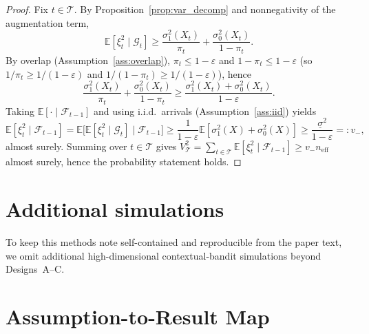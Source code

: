 \documentclass[11pt]{article}
\numberwithin{equation}{section}
\theoremstyle{plain}
\theoremstyle{definition}
\theoremstyle{remark}
\newcommand{\E}{\mathbb{E}}
\newcommand{\cF}{\mathcal{F}}
\newcommand{\cG}{\mathcal{G}}
\newcommand{\pit}{\pi_t}
\begin{document}
\begin{proof}
Fix $t\in\mathcal{T}$. By Proposition~\ref{prop:var_decomp} and nonnegativity of
the augmentation term,
\[
\E[\xi_t^2\mid \cG_t]
\ge
\frac{\sigma_1^2(X_t)}{\pit}+\frac{\sigma_0^2(X_t)}{1-\pit}.
\]
By overlap (Assumption~\ref{ass:overlap}), $\pi_t\le 1-\varepsilon$ and $1-\pi_t\le 1-\varepsilon$ (so $1/\pi_t\ge 1/(1-\varepsilon)$ and $1/(1-\pi_t)\ge 1/(1-\varepsilon)$), hence
\[
\frac{\sigma_1^2(X_t)}{\pi_t}+\frac{\sigma_0^2(X_t)}{1-\pi_t}
\ge
\frac{\sigma_1^2(X_t)+\sigma_0^2(X_t)}{1-\varepsilon}.
\]
Taking $\E[\cdot\mid \cF_{t-1}]$ and using i.i.d.\ arrivals (Assumption~\ref{ass:iid}) yields
\[
\E[\xi_t^2\mid \cF_{t-1}]
=
\E\big[\E[\xi_t^2\mid \cG_t]\mid \cF_{t-1}\big]
\ge
\frac{1}{1-\varepsilon}\E[\sigma_1^2(X)+\sigma_0^2(X)]
\ge
\frac{\underline{\sigma}^2}{1-\varepsilon}
=:v_-,
\]
almost surely.
Summing over $t\in\mathcal{T}$ gives $V_{\mathcal{T}}^2=\sum_{t\in\mathcal{T}}\E[\xi_t^2\mid \cF_{t-1}]\ge v_- n_{\mathrm{eff}}$ almost surely, hence the probability statement holds.
\end{proof}

\section{Additional simulations}\label{app:additional_simulations}
To keep this methods note self-contained and reproducible from the paper text, we omit additional high-dimensional contextual-bandit simulations beyond Designs~A--C.

\section{Assumption-to-Result Map}\label{app:assumptions}
\end{document}
